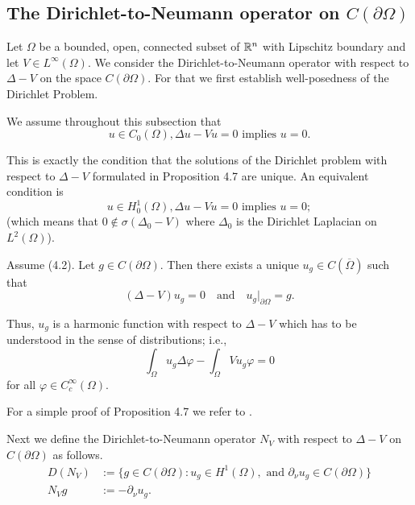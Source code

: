 


\subsection{The Dirichlet-to-Neumann operator on $C(\partial\Omega)$}

Let $\Omega$ be a bounded, open, connected subset of $\mathbb{R}^n$ with Lipschitz boundary and let $V \in L^\infty(\Omega)$. We consider the Dirichlet-to-Neumann operator with respect to $\Delta - V$ on the space $C(\partial\Omega)$. For that we first establish well-posedness of the Dirichlet Problem.

We assume throughout this subsection that
\begin{equation} \tag{4.2}
u \in C_0(\Omega), \Delta u - Vu = 0 \text{ implies } u = 0.
\end{equation}

This is exactly the condition that the solutions of the Dirichlet problem with respect to $\Delta - V$ formulated in Proposition 4.7 are unique. An equivalent condition is
\begin{equation} \tag{4.3}
u \in H^1_0(\Omega), \Delta u - Vu = 0 \text{ implies } u = 0;
\end{equation}
(which means that $0 \notin \sigma(\Delta_0 - V)$ where $\Delta_0$ is the Dirichlet Laplacian on $L^2(\Omega)$).

\begin{proposition}
Assume (4.2). Let $g \in C(\partial\Omega)$. Then there exists a unique $u_g \in C(\overline{\Omega})$ such that
\[(\Delta - V)u_g = 0 \quad \text{and} \quad u_g|_{\partial\Omega} = g.\]

Thus, $u_g$ is a harmonic function with respect to $\Delta - V$ which has to be understood in the sense of distributions; i.e.,
\[\int_\Omega u_g \Delta\varphi - \int_\Omega Vu_g \varphi = 0\]
for all $\varphi \in C_c^\infty(\Omega)$.
\end{proposition}

For a simple proof of Proposition 4.7 we refer to \cite{AtE19}.

Next we define the Dirichlet-to-Neumann operator $N_V$ with respect to $\Delta - V$ on $C(\partial\Omega)$ as follows.
\begin{align}
D(N_V) &:= \{g \in C(\partial\Omega) : u_g \in H^1(\Omega), \text{ and } \partial_\nu u_g \in C(\partial\Omega)\} \\
N_V g &:= -\partial_\nu u_g.
\end{align}

